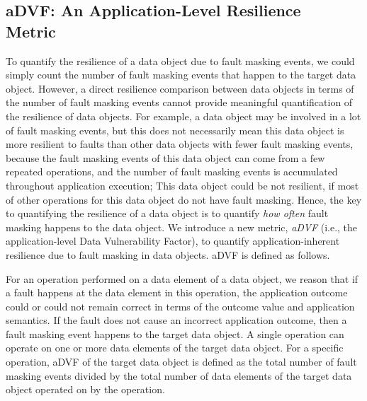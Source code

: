 \subsection{aDVF: An Application-Level Resilience \\ Metric}
\label{sec:metric}
To quantify the resilience of a data object due to fault masking events, we could simply count the number of fault masking events
that happen to the target data object. 
However, a direct resilience comparison between data objects in terms of the number of fault masking events cannot provide meaningful quantification of the resilience of data objects. 
For example, a data object %
may be involved in a lot of fault masking events, 
but this does not necessarily mean this data object is more resilient to faults
than other data objects with fewer fault masking events, because the fault masking events of this data object 
can come from a few repeated operations, and the number of fault masking events is accumulated throughout application execution;
This data object could be not resilient, if most of other operations for this data object do not have fault masking. 
Hence, the key to quantifying the resilience of a data object is
to quantify \textit{how often} fault masking happens to the data object.
We introduce a new metric, \textit{aDVF} (i.e., the application-level Data Vulnerability Factor), 
to quantify application-inherent resilience due to fault masking in data objects. aDVF is defined as follows. %

For an operation performed on a data element of a data object, we reason that if a fault happens at the data element in this operation, 
the application outcome could or could not remain correct in terms of the outcome value and application semantics. %
If the fault does not cause an incorrect application outcome,
then a fault masking event happens to the target data object.
A single operation can operate on one or more data elements of the target data object. 
For a specific operation, aDVF of the target data object is defined as the total number of fault masking events divided by the total number of data elements of the target data object operated on by the operation.

